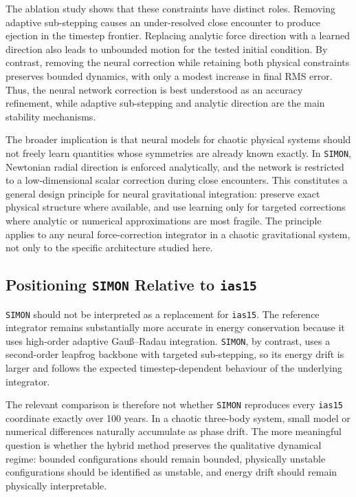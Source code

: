 \documentclass[12pt]{article}
\begin{document}
The ablation study shows that these constraints have distinct roles. Removing adaptive
sub-stepping causes an under-resolved close encounter to produce ejection in the timestep
frontier. Replacing analytic force direction with a learned direction also leads to
unbounded motion for the tested initial condition. By contrast, removing the neural
correction while retaining both physical constraints preserves bounded dynamics, with
only a modest increase in final RMS error. Thus, the neural network correction is best
understood as an accuracy refinement, while adaptive sub-stepping and analytic direction
are the main stability mechanisms.

The broader implication is that neural models for chaotic physical systems should not
freely learn quantities whose symmetries are already known exactly. In \texttt{SIMON},
Newtonian radial direction is enforced analytically, and the network is restricted to a
low-dimensional scalar correction during close encounters. This constitutes a general
design principle for neural gravitational integration: preserve exact physical structure
where available, and use learning only for targeted corrections where analytic or
numerical approximations are most fragile. The principle applies to any neural
force-correction integrator in a chaotic gravitational system, not only to the specific
architecture studied here.

\subsection{Positioning \texttt{SIMON} Relative to \texttt{ias15}}

\texttt{SIMON} should not be interpreted as a replacement for \texttt{ias15}. The reference
integrator remains substantially more accurate in energy conservation because it uses
high-order adaptive Gau\ss--Radau integration. \texttt{SIMON}, by contrast, uses a
second-order leapfrog backbone with targeted sub-stepping, so its energy drift is larger
and follows the expected timestep-dependent behaviour of the underlying integrator.

The relevant comparison is therefore not whether \texttt{SIMON} reproduces every
\texttt{ias15} coordinate exactly over 100 years. In a chaotic three-body system, small
model or numerical differences naturally accumulate as phase drift. The more meaningful
question is whether the hybrid method preserves the qualitative dynamical regime:
bounded configurations should remain bounded, physically unstable configurations should
be identified as unstable, and energy drift should remain physically interpretable.
\end{document}
